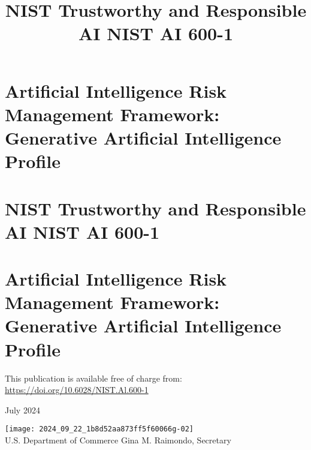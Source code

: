 \documentclass[10pt]{article}
\title{NIST Trustworthy and Responsible AI NIST AI 600-1 }
\author{}
\date{}
\begin{document}
\maketitle
\section*{Artificial Intelligence Risk Management Framework: Generative Artificial Intelligence Profile}
\section*{NIST Trustworthy and Responsible AI NIST AI 600-1}
\section*{Artificial Intelligence Risk Management Framework: Generative Artificial Intelligence Profile}
This publication is available free of charge from:\\
\href{https://doi.org/10.6028/NIST.Al.600-1}{https://doi.org/10.6028/NIST.Al.600-1}

July 2024

\texttt{[image: 2024\_09\_22\_1b8d52aa873ff5f60066g-02]}\\
U.S. Department of Commerce Gina M. Raimondo, Secretary
\end{document}
